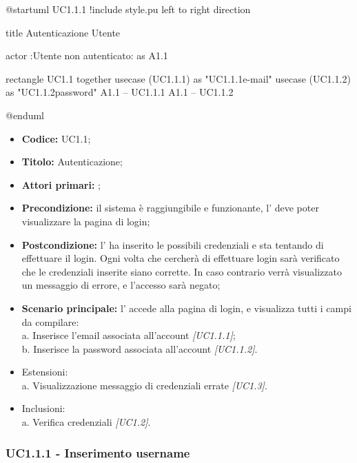 \documentclass[casi-duso]{subfiles}
\begin{document}
\begin{plantuml}
@startuml UC1.1.1
!include style.pu
left to right direction

title Autenticazione Utente

actor :Utente non autenticato: as A1.1

rectangle UC1.1{
  together {
  usecase (UC1.1.1) as "UC1.1.1\nInserimento e-mail"
  usecase (UC1.1.2) as "UC1.1.2\nInserimento password"
  }
}
A1.1 -- UC1.1.1
A1.1 -- UC1.1.2

@enduml
\end{plantuml}


\begin{itemize}
  \item \textbf{Codice:} UC1.1;
  \item \textbf{Titolo:} Autenticazione;
  \item \textbf{Attori primari:} ;
  \item \textbf{Precondizione:} il sistema è raggiungibile e funzionante, l' deve poter visualizzare la pagina di login;
  \item \textbf{Postcondizione:} l' ha inserito le possibili credenziali e sta tentando di effettuare il login. Ogni volta che cercherà di effettuare
        login sarà verificato che le credenziali inserite siano corrette. In caso contrario verrà visualizzato un messaggio di errore, e l'accesso sarà negato;
  \item \textbf{Scenario principale:} l' accede alla pagina di login, e visualizza tutti i campi da compilare:
        \\a. Inserisce l’email associata all’account \emph{[UC1.1.1]};
        \\b. Inserisce la password associata all’account \emph{[UC1.1.2]}.
  \item Estensioni:
        \\a. Visualizzazione messaggio di credenziali errate \emph{[UC1.3]}.
  \item Inclusioni:
        \\a. Verifica credenziali \emph{[UC1.2]}.
  
\end{itemize}

\subsubsection{UC1.1.1 - Inserimento username}
\label{subsub:UC1.1.1}
\end{document}
